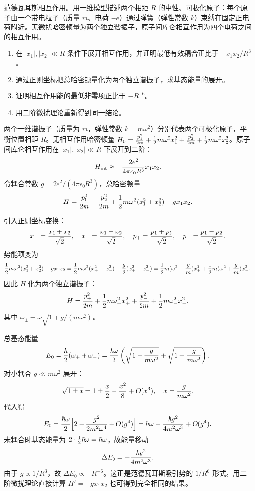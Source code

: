 \begin{question}
范德瓦耳斯相互作用。用一维模型描述两个相距 $R$ 的中性、可极化原子：每个原子由一个带电粒子（质量 $m$、电荷 $-e$）通过弹簧（弹性常数 $k$）束缚在固定正电荷附近。无微扰哈密顿量为两个独立谐振子，原子间库仑相互作用为四个电荷之间的相互作用。
\begin{enumerate}
\item 在 $|x_1|,|x_2|\ll R$ 条件下展开相互作用，并证明最低有效耦合正比于 $-x_1x_2/R^3$。
\item 通过正则坐标把总哈密顿量化为两个独立谐振子，求基态能量的展开。
\item 证明相互作用能的最低非零项正比于 $-R^{-6}$。
\item 用二阶微扰理论重新得到同一结论。
\end{enumerate}
\end{question}
\begin{solution}
两个一维谐振子（质量为 $m$，弹性常数 $k=m\omega^2$）分别代表两个可极化原子，平衡位置相距 $R$。无相互作用哈密顿量 $H_0={p_1^2\over2m}+{1\over2}m\omega^2x_1^2+{p_2^2\over2m}+{1\over2}m\omega^2x_2^2$。原子间库仑相互作用在 $|x_1|,|x_2|\ll R$ 下展开到二阶：
\[
H_{\rm int} \approx -{2e^2\over4\pi\epsilon_0 R^3}x_1x_2.
\]
令耦合常数 $g=2e^2/(4\pi\epsilon_0 R^3)$，总哈密顿量
\[
H = {p_1^2\over2m}+{p_2^2\over2m}+{1\over2}m\omega^2(x_1^2+x_2^2)-g x_1x_2.
\]

引入正则坐标变换：
\[
x_+ = {x_1+x_2\over\sqrt2},\quad x_- = {x_1-x_2\over\sqrt2},\quad
p_+ = {p_1+p_2\over\sqrt2},\quad p_- = {p_1-p_2\over\sqrt2}.
\]
势能项变为
\[
{1\over2}m\omega^2(x_1^2+x_2^2)-g x_1x_2
= {1\over2}m\omega^2(x_+^2+x_-^2)-{g\over2}(x_+^2-x_-^2)
= {1\over2}m(\omega^2-{g\over m})x_+^2
+ {1\over2}m(\omega^2+{g\over m})x_-^2.
\]
因此 $H$ 化为两个独立谐振子：
\[
H = {p_+^2\over2m}+{1\over2}m\omega_+^2x_+^2
+ {p_-^2\over2m}+{1\over2}m\omega_-^2x_-^2,
\]
其中 $\omega_\pm = \omega\sqrt{1\mp g/(m\omega^2)}$。

总基态能量
\[
E_0 = {\hbar\over2}(\omega_++\omega_-)
= {\hbar\omega\over2}\left(\sqrt{1-{g\over m\omega^2}}+\sqrt{1+{g\over m\omega^2}}\right).
\]
对小耦合 $g\ll m\omega^2$ 展开：
\[
\sqrt{1\pm x} = 1\pm{x\over2}-{x^2\over8}+O(x^3),\quad x={g\over m\omega^2}.
\]
代入得
\[
E_0 = {\hbar\omega\over2}\Bigl[2 - {g^2\over2m^2\omega^4}+O(g^4)\Bigr]
= \hbar\omega - {\hbar g^2\over4m^2\omega^3}+O(g^4).
\]
未耦合时基态能量为 $2\cdot{1\over2}\hbar\omega=\hbar\omega$，故能量移动
\[
\Delta E_0 = -{\hbar g^2\over4m^2\omega^3}.
\]
由于 $g\propto 1/R^3$，故 $\Delta E_0 \propto -R^{-6}$。这正是范德瓦耳斯吸引势的 $1/R^6$ 形式。用二阶微扰理论直接计算 $H'=-g x_1x_2$ 也可得到完全相同的结果。
\end{solution}

